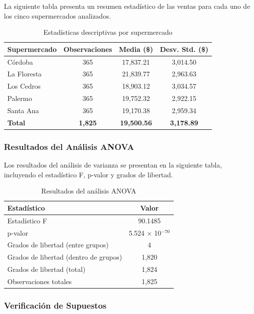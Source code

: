 \documentclass[11pt,a4paper]{article}
\begin{document}
La siguiente tabla presenta un resumen estadístico de las ventas para cada uno de los cinco supermercados analizados.

\begin{table}[H]
\centering
\caption{Estadísticas descriptivas por supermercado}
\begin{tabular}{|l|c|c|c|}
\hline
\textbf{Supermercado} & \textbf{Observaciones} & \textbf{Media (\$)} & \textbf{Desv. Std. (\$)} \\
\hline
Córdoba & 365 & 17,837.21 & 3,014.50 \\
La Floresta & 365 & 21,839.77 & 2,963.63 \\
Los Cedros & 365 & 18,903.12 & 3,034.57 \\
Palermo & 365 & 19,752.32 & 2,922.15 \\
Santa Ana & 365 & 19,170.38 & 2,959.34 \\
\hline
\textbf{Total} & \textbf{1,825} & \textbf{19,500.56} & \textbf{3,178.89} \\
\hline
\end{tabular}
\end{table}

\subsubsection{Resultados del Análisis ANOVA}

Los resultados del análisis de varianza se presentan en la siguiente tabla, incluyendo el estadístico F, p-valor y grados de libertad.

\begin{table}[H]
\centering
\caption{Resultados del análisis ANOVA}
\begin{tabular}{|l|c|}
\hline
\textbf{Estadístico} & \textbf{Valor} \\
\hline
Estadístico F & 90.1485 \\
p-valor & 5.524 $\times$ 10$^{-70}$ \\
Grados de libertad (entre grupos) & 4 \\
Grados de libertad (dentro de grupos) & 1,820 \\
Grados de libertad (total) & 1,824 \\
Observaciones totales & 1,825 \\
\hline
\end{tabular}
\end{table}

\subsubsection{Verificación de Supuestos}
\end{document}

